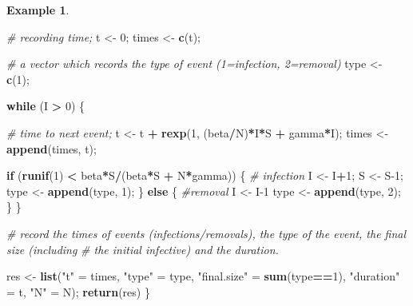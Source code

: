 \documentclass[
]{book}
\newenvironment{Shaded}{\begin{snugshade}}{\end{snugshade}}
\newcommand{\CommentTok}[1]{\textcolor[rgb]{0.56,0.35,0.01}{\textit{#1}}}
\newcommand{\ControlFlowTok}[1]{\textcolor[rgb]{0.13,0.29,0.53}{\textbf{#1}}}
\newcommand{\DecValTok}[1]{\textcolor[rgb]{0.00,0.00,0.81}{#1}}
\newcommand{\FunctionTok}[1]{\textcolor[rgb]{0.13,0.29,0.53}{\textbf{#1}}}
\newcommand{\NormalTok}[1]{#1}
\newcommand{\OtherTok}[1]{\textcolor[rgb]{0.56,0.35,0.01}{#1}}
\newcommand{\SpecialCharTok}[1]{\textcolor[rgb]{0.81,0.36,0.00}{\textbf{#1}}}
\newcommand{\StringTok}[1]{\textcolor[rgb]{0.31,0.60,0.02}{#1}}
\theoremstyle{definition}
\theoremstyle{definition}
\newtheorem{example}{Example}[chapter]
\theoremstyle{definition}
\theoremstyle{definition}
\theoremstyle{remark}
\begin{document}
\begin{example}
\begin{Shaded}
\begin{Highlighting}[]
  \CommentTok{\# recording time;}
\NormalTok{  t }\OtherTok{\textless{}{-}} \DecValTok{0}\NormalTok{;}
\NormalTok{  times }\OtherTok{\textless{}{-}} \FunctionTok{c}\NormalTok{(t);}
  
  \CommentTok{\# a vector which records the type of event (1=infection, 2=removal)}
\NormalTok{  type }\OtherTok{\textless{}{-}} \FunctionTok{c}\NormalTok{(}\DecValTok{1}\NormalTok{);}
  
  \ControlFlowTok{while}\NormalTok{ (I }\SpecialCharTok{\textgreater{}} \DecValTok{0}\NormalTok{) \{}
    
    \CommentTok{\# time to next event;}
\NormalTok{    t }\OtherTok{\textless{}{-}}\NormalTok{ t }\SpecialCharTok{+} \FunctionTok{rexp}\NormalTok{(}\DecValTok{1}\NormalTok{, (beta}\SpecialCharTok{/}\NormalTok{N)}\SpecialCharTok{*}\NormalTok{I}\SpecialCharTok{*}\NormalTok{S }\SpecialCharTok{+}\NormalTok{ gamma}\SpecialCharTok{*}\NormalTok{I);}
\NormalTok{    times }\OtherTok{\textless{}{-}} \FunctionTok{append}\NormalTok{(times, t);}
    
    \ControlFlowTok{if}\NormalTok{ (}\FunctionTok{runif}\NormalTok{(}\DecValTok{1}\NormalTok{) }\SpecialCharTok{\textless{}}\NormalTok{ beta}\SpecialCharTok{*}\NormalTok{S}\SpecialCharTok{/}\NormalTok{(beta}\SpecialCharTok{*}\NormalTok{S }\SpecialCharTok{+}\NormalTok{ N}\SpecialCharTok{*}\NormalTok{gamma)) \{}
      \CommentTok{\# infection}
\NormalTok{      I }\OtherTok{\textless{}{-}}\NormalTok{ I}\SpecialCharTok{+}\DecValTok{1}\NormalTok{;}
\NormalTok{      S }\OtherTok{\textless{}{-}}\NormalTok{ S}\DecValTok{{-}1}\NormalTok{;}
\NormalTok{      type }\OtherTok{\textless{}{-}} \FunctionTok{append}\NormalTok{(type, }\DecValTok{1}\NormalTok{);}
\NormalTok{    \}}
    \ControlFlowTok{else}\NormalTok{ \{}
      \CommentTok{\#removal}
\NormalTok{      I }\OtherTok{\textless{}{-}}\NormalTok{ I}\DecValTok{{-}1}
\NormalTok{      type }\OtherTok{\textless{}{-}} \FunctionTok{append}\NormalTok{(type, }\DecValTok{2}\NormalTok{);}
\NormalTok{    \}}
\NormalTok{  \}}
  
  
  \CommentTok{\# record the times of events (infections/removals), the type of the event, the final size (including}
  \CommentTok{\# the initial infective) and the duration. }
  
\NormalTok{  res }\OtherTok{\textless{}{-}} \FunctionTok{list}\NormalTok{(}\StringTok{"t"} \OtherTok{=}\NormalTok{ times, }\StringTok{"type"} \OtherTok{=}\NormalTok{ type, }\StringTok{"final.size"} \OtherTok{=} \FunctionTok{sum}\NormalTok{(type}\SpecialCharTok{==}\DecValTok{1}\NormalTok{), }\StringTok{"duration"} \OtherTok{=}\NormalTok{ t, }\StringTok{"N"} \OtherTok{=}\NormalTok{ N);}
  \FunctionTok{return}\NormalTok{(res)}
\NormalTok{\}}


\end{Highlighting}
\end{Shaded}
\end{example}
\end{document}
